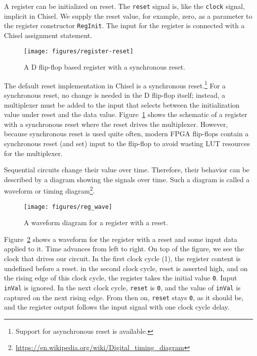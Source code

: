 \documentclass[%
    10pt,
    headinclude, footexclude,
    openright, %
    notitlepage,
    cleardoubleempty,
    headsepline,
    pointlessnumbers,
    bibtotoc, idxtotoc,
    ]{scrbook}
\newcommand{\scale}{0.7}
\newcommand{\code}[1]{{\lstinline[basicstyle=\small\ttfamily]{#1}}}
\newcommand{\myref}[2]{\href{#1}{#2}}
\renewcommand{\myref}[2]{{#2}{\footnote{\url{#1}}}}
\begin{document}
A register can be initialized on reset. The \code{reset} signal is, like the \code{clock} signal,
implicit in Chisel. We supply the reset value, for example, zero, as a parameter to the register
constructor \code{RegInit}. The input for the register is connected with a Chisel
assignment statement.


\begin{figure}
  \centering
  \texttt{[image: figures/register-reset]}
  \caption{A D flip-flop based register with a synchronous reset.}
  \label{fig:register-reset}
\end{figure}


The default reset implementation in Chisel is a synchronous
reset.\footnote{Support for asynchronous reset is available.}
For a synchronous reset, no change is needed in the D flip-flop itself; instead, a multiplexer must be added to the input that
selects between the initialization value under reset and the data value.
Figure~\ref{fig:register-reset} shows the schematic of a register with a synchronous reset
where the reset drives the multiplexer. However, because synchronous reset is used quite often,
modern FPGA flip-flops contain a synchronous reset (and set) input to the flip-flop to avoid wasting
LUT resources for the multiplexer.

Sequential circuits change their value over time. Therefore, their behavior can be described
by a diagram showing the signals over time. Such a diagram is called a waveform or
\myref{https://en.wikipedia.org/wiki/Digital_timing_diagram}{timing diagram}.


\begin{figure}
  \centering
  \texttt{[image: figures/reg\_wave]}
  \caption{A waveform diagram for a register with a reset.}
  \label{fig:register-wave}
\end{figure}

Figure~\ref{fig:register-wave} shows a waveform for the register with a reset
and some input data applied to it.
Time advances from left to right. On top of the figure, we see the clock that drives our circuit.
In the first clock cycle (1), the register content is undefined before a reset.
in the second clock cycle, reset is asserted high, and on the rising edge of this clock cycle, the register
takes the initial value \code{0}. Input \code{inVal} is ignored. In the next clock cycle,
\code{reset} is \code{0}, and the value of \code{inVal} is captured on the next rising
edge. From then on, \code{reset} stays \code{0}, as it should be, and the
register output follows the input signal with one clock cycle delay.
\end{document}
